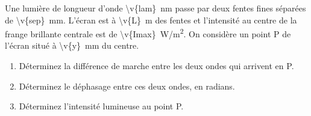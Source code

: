 Une lumière de longueur d'onde \qty{\v{lam}}{nm} passe par deux fentes fines séparées de \qty{\v{sep}}{mm}. L'écran est à \qty{\v{L}}{m} des fentes et l'intensité au centre de la frange brillante centrale est de \qty{\v{Imax}}{W/m^2}. On considère un point P de l'écran situé à \qty{\v{y}}{mm} du centre.

\begin{enumerate}[label=\alph*)]
    \item Déterminez la différence de marche entre les deux ondes qui arrivent en P.
    \item Déterminez le déphasage entre ces deux ondes, en radians.
    \item Déterminez l'intensité lumineuse au point P.
\end{enumerate}
